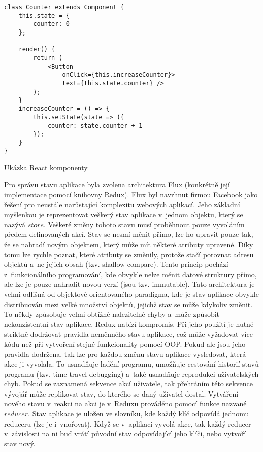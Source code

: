 \begin{listing}
\begin{verbatim}
class Counter extends Component {
    this.state = {
        counter: 0
    };

    render() {
        return (
            <Button
                onClick={this.increaseCounter}>
                text={this.state.counter} />
        );
    }
    increaseCounter = () => {
        this.setState(state => ({
            counter: state.counter + 1
        });
    }
}
\end{verbatim}
\caption{Ukázka React komponenty}
\label{code:reactcomponent}
\end{listing}

Pro správu stavu aplikace byla zvolena architektura Flux (konkrétně její implementace pomocí knihovny Redux). Flux byl navrhnut firmou Facebook jako řešení pro neustále narůstající komplexitu webových aplikací. Jeho základní myšlenkou je reprezentovat veškerý stav aplikace v~jednom objektu, který se nazývá $store$. Veškeré změny tohoto stavu musí proběhnout pouze vyvoláním předem definovaných akcí. Stav se nesmí měnit přímo, lze ho upravit pouze tak, že se nahradí novým objektem, který může mít některé atributy upravené. Díky tomu lze rychle poznat, které atributy se změnily, protože stačí porovnat adresu objektů a~ne jejich obsah (tzv. shallow compare). Tento princip pochází z~funkcionálního programování, kde obvykle nelze měnit datové struktury přímo, ale lze je pouze nahradit novou verzí (jsou tzv. immutable). Tato architektura je velmi odlišná od objektově orientovaného paradigma, kde je stav aplikace obvykle distribuován mezi velké množství objektů, jejichž stav se může kdykoliv změnit. To někdy způsobuje velmi obtížně nalezitelné chyby a~může způsobit nekonzistentní stav aplikace. Redux nabízí kompromis. Při jeho použití je nutné striktně dodržovat pravidla neměnného stavu aplikace, což může vyžadovat více kódu než při vytvoření stejné funkcionality pomocí OOP. Pokud ale jsou jeho pravidla dodržena, tak lze pro každou změnu stavu aplikace vysledovat, která akce ji vyvolala. To usnadňuje ladění programu, umožňuje cestování historií stavů programu (tzv. time-travel debugging) a~také usnadňuje reprodukci uživatelských chyb. Pokud se zaznamená sekvence akcí uživatele, tak přehráním této sekvence vývojář může replikovat stav, do kterého se daný uživatel dostal. 
Vytváření nového stavu v~reakci na akci je v~Reduxu prováděno pomocí funkce nazvané $reducer$. Stav aplikace je uložen ve slovníku, kde každý klíč odpovídá jednomu reduceru (lze je i~vnořovat). Když se v~aplikaci vyvolá akce, tak každý reducer v~závislosti na ni buď vrátí původní stav odpovídající jeho klíči, nebo vytvoří stav nový.
